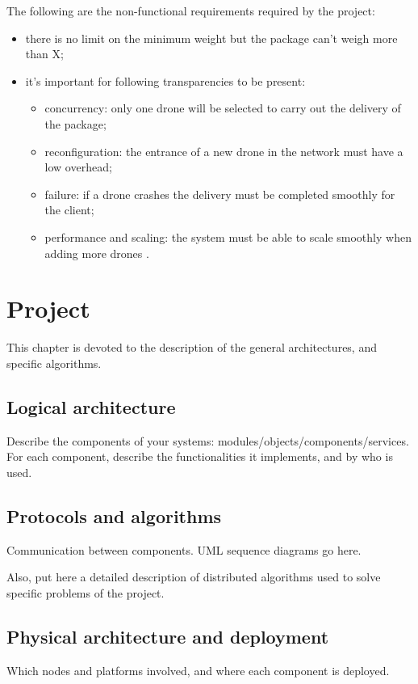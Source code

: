 \documentclass[a4paper, oneside]{memoir}
\begin{document}
The following are the non-functional requirements required by the project:
\begin{itemize}
\item there is no limit on the minimum weight but the package can't weigh more than X;
\item it's important for following transparencies to be present:
	\begin{itemize}
	\item concurrency: only one drone will be selected to carry out the delivery of the package;
	\item reconfiguration: the entrance of a new drone in the network must have a low overhead;
	\item failure: if a drone crashes the delivery must be completed smoothly for the client;
	\item performance and scaling: the system must be able to scale smoothly when adding more drones .
	\end{itemize}
\end{itemize}


\chapter{Project}

This chapter is devoted to the description of the general architectures, and specific algorithms.

\section{Logical architecture}
Describe the components of your systems: modules/objects/components/services.
For each component, describe the functionalities it implements, and by who is used.

\section{Protocols and algorithms}
Communication between components.  UML sequence diagrams go here.

Also, put here a detailed description of distributed algorithms used to solve specific problems of the project.

\section{Physical architecture and deployment}
Which nodes and platforms involved, and where each component is deployed.
\end{document}
